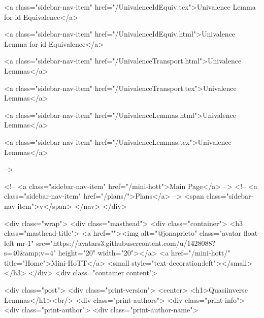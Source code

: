       
    
      
        
          <a class="sidebar-nav-item" href="/UnivalenceIdEquiv.tex">Univalence Lemma for id Equivalence</a>
        
      
    
      
        
          <a class="sidebar-nav-item" href="/UnivalenceIdEquiv.html">Univalence Lemma for id Equivalence</a>
        
      
    
      
        
          <a class="sidebar-nav-item" href="/UnivalenceTransport.html">Univalence Lemmas</a>
        
      
    
      
        
          <a class="sidebar-nav-item" href="/UnivalenceTransport.tex">Univalence Lemmas</a>
        
      
    
      
        
          <a class="sidebar-nav-item" href="/UnivalenceLemmas.html">Univalence Lemmas</a>
        
      
    
      
        
          <a class="sidebar-nav-item" href="/UnivalenceLemmas.tex">Univalence Lemmas</a>
        
      
     -->

    <!-- <a class="sidebar-nav-item" href="/mini-hott">Main Page</a> -->
    <!-- <a class="sidebar-nav-item" href="/plans/">Plans</a> -->
    <span class="sidebar-nav-item">v</span>
  </nav>
</div>

    <div class="wrap">
      <div class="masthead">
        <div class="container">
          <h3 class="masthead-title">
            <a href=""><img alt="@jonaprieto" class="avatar float-left mr-1" src="https://avatars3.githubusercontent.com/u/1428088?s=40&amp;v=4" height="20" width="20"></a>
            <a href="/mini-hott/" title="Home">Mini-HoTT</a>
            <small style="text-decoration:left"></small>
          </h3>
        </div>
      <div class="container content">
        







<div class="post">
  <div class="print-version">
    <center>
      <h1>Quasiinverse Lemmas</h1><br/>
        <div class="print-authors">
          <div class="print-info">
            <div class="print-author">
              <div class="print-author-name">
                
